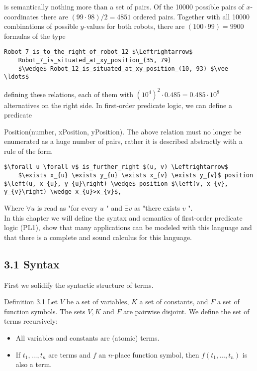 \documentclass[10pt]{article}
\begin{document}
is semantically nothing more than a set of pairs. Of the 10000 possible pairs of $x$-coordinates there are $(99 \cdot 98) / 2=4851$ ordered pairs. Together with all 10000 combinations of possible $y$-values for both robots, there are $(100 \cdot 99)=9900$ formulas of the type

\begin{verbatim}
Robot_7_is_to_the_right_of_robot_12 $\Leftrightarrow$
    Robot_7_is_situated_at_xy_position_(35, 79)
    $\wedge$ Robot_12_is_situated_at_xy_position_(10, 93) $\vee \ldots$
\end{verbatim}

defining these relations, each of them with $\left(10^{4}\right)^{2} \cdot 0.485=0.485 \cdot 10^{8}$ alternatives on the right side. In first-order predicate logic, we can define a predicate

Position(number, xPosition, yPosition). The above relation must no longer be enumerated as a huge number of pairs, rather it is described abstractly with a rule of the form

\begin{verbatim}
$\forall u \forall v$ is_further_right $(u, v) \Leftrightarrow$
    $\exists x_{u} \exists y_{u} \exists x_{v} \exists y_{v}$ position $\left(u, x_{u}, y_{u}\right) \wedge$ position $\left(v, x_{v}, y_{v}\right) \wedge x_{u}>x_{v}$,
\end{verbatim}

Where $\forall u$ is read as "for every $u$ " and $\exists v$ as "there exists $v$ ".\\
In this chapter we will define the syntax and semantics of first-order predicate logic (PL1), show that many applications can be modeled with this language and that there is a complete and sound calculus for this language.

\subsection*{3.1 Syntax}
First we solidify the syntactic structure of terms.

Definition 3.1 Let $V$ be a set of variables, $K$ a set of constants, and $F$ a set of function symbols. The sets $V, K$ and $F$ are pairwise disjoint. We define the set of terms recursively:

\begin{itemize}
  \item All variables and constants are (atomic) terms.
  \item If $t_{1}, \ldots, t_{n}$ are terms and $f$ an $n$-place function symbol, then $f\left(t_{1}, \ldots, t_{n}\right)$ is also a term.
\end{itemize}
\end{document}
